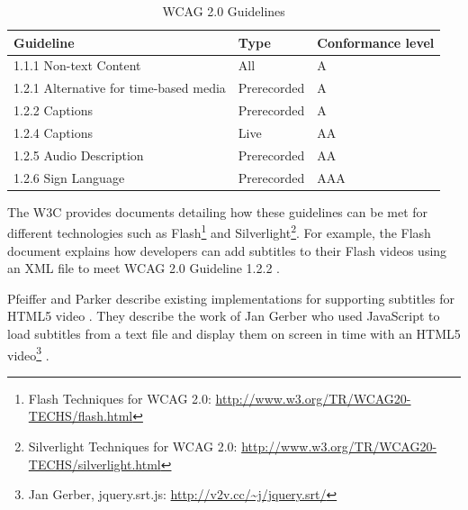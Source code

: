 \documentclass[journal]{IEEEtran}
\begin{document}
\begin{table}
  \caption{WCAG 2.0 Guidelines \cite{standard:wcag2}}
  \label{tab:wcag2Guidelines}
  	\centering
    \begin{tabular}{|l|l|p{1.5cm}|}
    \hline
    \textbf{Guideline}          & \textbf{Type} & \textbf{Conformance level} \\ \hline
    1.1.1 Non-text Content                 & All         & A                 \\ \hline
    1.2.1 Alternative for time-based media & Prerecorded & A                 \\ \hline
    1.2.2 Captions                         & Prerecorded & A                 \\ \hline
    1.2.4 Captions                         & Live        & AA                \\ \hline
    1.2.5 Audio Description                & Prerecorded & AA                \\ \hline
    1.2.6 Sign Language                    & Prerecorded & AAA               \\ \hline
    \end{tabular}
\end{table}

The W3C provides documents detailing how these guidelines can be met for different technologies such as Flash\footnote{Flash Techniques for WCAG 2.0: \url{http://www.w3.org/TR/WCAG20-TECHS/flash.html}} and Silverlight\footnote{Silverlight Techniques for WCAG 2.0: \url{http://www.w3.org/TR/WCAG20-TECHS/silverlight.html}}. For example, the Flash document explains how developers can add subtitles to their Flash videos using an XML file to meet WCAG 2.0 Guideline 1.2.2 \cite{website:flashTechniquesForWCAG}.

Pfeiffer and Parker describe existing implementations for supporting subtitles for HTML5 video \cite{inproceedings:accessibilityForTheHTML5VideoElement}. They describe the work of Jan Gerber who used JavaScript to load subtitles from a text file and display them on screen in time with an HTML5 video\footnote{Jan Gerber, jquery.srt.js: \url{http://v2v.cc/~j/jquery.srt/}} \cite{inproceedings:accessibilityForTheHTML5VideoElement}.
\end{document}
